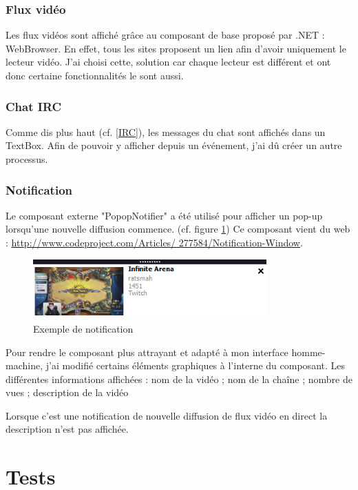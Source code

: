\documentclass[11pt]{report} %
\begin{document}
		\subsection{Flux vidéo}
		Les flux vidéos sont affiché grâce au composant de base proposé par .NET : WebBrowser. En effet, tous les sites proposent un lien afin d'avoir uniquement le lecteur vidéo.
		J'ai choisi cette, solution car chaque lecteur est différent et ont donc certaine fonctionnalités le sont aussi.
		
		\subsection{Chat IRC}
		Comme dis plus haut (cf. \ref{IRC}), les messages du chat sont affichés dans un TextBox. Afin de pouvoir y afficher depuis un événement, j'ai dû créer un autre processus.
		
		
		\subsection{Notification}
		Le composant externe "PopopNotifier" a été utilisé pour afficher un pop-up lorsqu’une nouvelle
		diffusion commence. (cf. figure \ref{vue notification})  Ce composant vient du web : \url{http://www.codeproject.com/Articles/
		277584/Notification-Window}.
		
		\begin{figure}[h]
			\center
			\includegraphics[width=0.8\textwidth]{../img/notificationview.png}
			\caption{Exemple de notification}
			\label{vue notification}
		\end{figure}
		
		Pour rendre le composant plus attrayant et adapté à mon interface homme-machine, j’ai modifié
		certains éléments graphiques à l'interne du composant.
		Les différentes informations affichées : nom de la vidéo ; nom de la chaîne ; nombre de vues ; description de la vidéo
		
		Lorsque c'est une notification de nouvelle diffusion de flux vidéo en direct la description n'est pas affichée.
		
	
\chapter{Tests}
\end{document}
